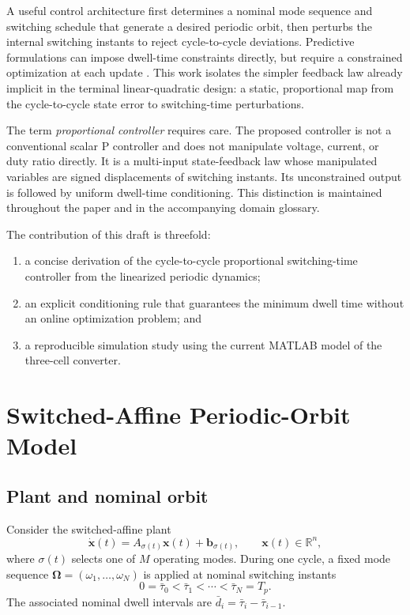 \documentclass[11pt]{article}
\newcommand{\R}{\mathbb{R}}
\newcommand{\vect}[1]{\bm{#1}}
\begin{document}
A useful control architecture first determines a nominal mode sequence and switching schedule that generate a desired periodic orbit, then perturbs the internal switching instants to reject cycle-to-cycle deviations. Predictive formulations can impose dwell-time constraints directly, but require a constrained optimization at each update \cite{patino2010,marcolino2021,vieira2024}. This work isolates the simpler feedback law already implicit in the terminal linear-quadratic design: a static, proportional map from the cycle-to-cycle state error to switching-time perturbations.

The term \emph{proportional controller} requires care. The proposed controller is not a conventional scalar P controller and does not manipulate voltage, current, or duty ratio directly. It is a multi-input state-feedback law whose manipulated variables are signed displacements of switching instants. Its unconstrained output is followed by uniform dwell-time conditioning. This distinction is maintained throughout the paper and in the accompanying domain glossary.

The contribution of this draft is threefold:
\begin{enumerate}
    \item a concise derivation of the cycle-to-cycle proportional switching-time controller from the linearized periodic dynamics;
    \item an explicit conditioning rule that guarantees the minimum dwell time without an online optimization problem; and
    \item a reproducible simulation study using the current MATLAB model of the three-cell converter.
\end{enumerate}

\section{Switched-Affine Periodic-Orbit Model}
\label{sec:model}

\subsection{Plant and nominal orbit}

Consider the switched-affine plant
\begin{equation}
    \dot{\vect{x}}(t)
    = A_{\sigma(t)}\vect{x}(t) + \vect{b}_{\sigma(t)},
    \qquad \vect{x}(t)\in\R^n,
    \label{eq:plant}
\end{equation}
where $\sigma(t)$ selects one of $M$ operating modes. During one cycle, a fixed mode sequence
$\bm{\Omega}=(\omega_1,\ldots,\omega_N)$ is applied at nominal switching instants
\begin{equation}
    0=\bar\tau_0 < \bar\tau_1 < \cdots < \bar\tau_N=T_p.
\end{equation}
The associated nominal dwell intervals are
$\bar d_i=\bar\tau_i-\bar\tau_{i-1}$.
\end{document}
